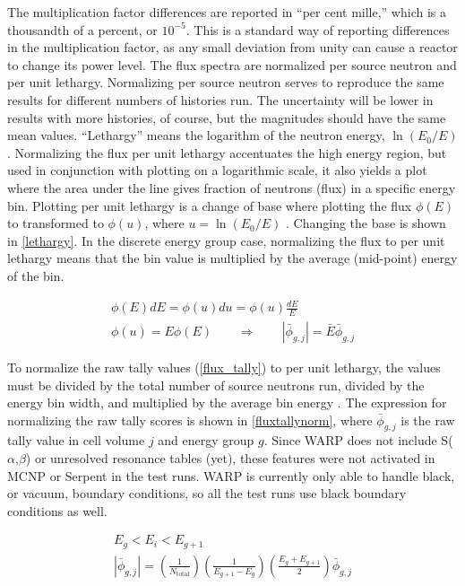 The multiplication factor differences are reported in ``per cent mille,'' which is a thousandth of a percent, or $10^{-5}$.  This is a standard way of reporting differences in the multiplication factor, as any small deviation from unity can cause a reactor to change its power level.  The flux spectra are normalized per source neutron and per unit lethargy.  Normalizing per source neutron serves to reproduce the same results for different numbers of histories run.  The uncertainty will be lower in results with more histories, of course, but the magnitudes should have the same mean values.   ``Lethargy'' means the logarithm of the neutron energy, $\ln(E_0/E)$ \cite{duderstadt}.  Normalizing the flux per unit lethargy accentuates the high energy region, but used in conjunction with plotting on a logarithmic scale, it also yields a plot where the area under the line gives fraction of neutrons (flux) in a specific energy bin.  Plotting per unit lethargy is a change of base where plotting the flux $\phi(E)$ to transformed to $\phi(u)$, where $u=\ln(E_0/E)$ \cite{lethargyplot}.  Changing the base is shown in \eqref{lethargy}.  In the discrete energy group case, normalizing the flux to per unit lethargy means that the bin value is multiplied by the average (mid-point) energy of the bin.

\begin{equation}
\label{lethargy}
\begin{gathered}
\phi(E) dE = \phi(u) du = \phi(u) \frac{dE}{E}\\
\phi(u) = E \phi(E) \qquad \Rightarrow \qquad  |\bar{\phi}_{g,j}| = \bar{E} \bar{\phi}_{g,j}
\end{gathered}
\end{equation}

To normalize the raw tally values (\eqref{flux_tally}) to per unit lethargy, the values must be divided by the total number of source neutrons run, divided by the energy bin width, and multiplied by the average bin energy \cite{lethargyplot}.  The expression for normalizing the raw tally scores is shown in \eqref{fluxtallynorm}, where $\bar{\phi}_{g,j}$ is the raw tally value in cell volume $j$ and energy group $g$.  Since WARP does not include S($\alpha$,$\beta$) or unresolved resonance tables (yet), these features were not activated in MCNP or Serpent in the test runs.  WARP is currently only able to handle black, or vacuum, boundary conditions, so all the test runs use black boundary conditions as well.

\begin{equation}
\label{fluxtallynorm}
\begin{gathered}
E_g < E_i < E_{g+1} \\
|\bar{\phi}_{g,j}| = \left( \frac{1}{N_\mathrm{total}}\right) \left(\frac{1}{E_{g+1}-E_g}\right) \left(\frac{E_g+E_{g+1}}{2} \right) \bar{\phi}_{g,j}
\end{gathered}
\end{equation}

